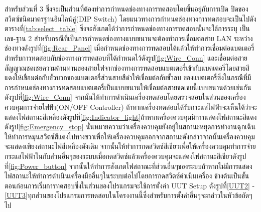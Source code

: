 สำหรับส่วนที่ 3 ซึ่งจะเป็นส่วนที่ต้องทำการกำหนดช่องทางการทดสอบโดยขึ้นอยู่กับการเปิด ปิดของสวิตซ์ชนิดมาตรฐานอินไลน์คู่(DIP Switch)
โดยแนวทางการกำหนดช่องทางการทดสอบจะเป็นไปดังตารางที่\ref{tab:select_table} ซึ่งจะสังเกตได้ว่าการกำหนดช่องทางการทดสอบนั้นจะใช้การระบุ
เป็นเลข-ฐาน 2 สำหรับกรณีที่เป็นการกำหนดช่องทางแบบขนานจะต้องทำการเชื่อมต่อสาย LAN ระหว่างช่องทางดังรูปที่\ref{fig:Rear_Panel} เมื่อกำหนดช่องทางการทดสอบได้แล้วให้ทำการเชื่อมต่อแบตเตอรี่สำหรับการทดสอบกับช่องทางการทดสอบที่ได้กำหนดไว้ดังรูป\ref{fig:Wire_Conn} และเชื่อมต่อสายสัญญาณชดเชยความต้านทานของสายไฟจากช่องทางการทดสอบแบตเตอรี่เข้ากับแบตเตอรี่โดยสายสีแดงให้เชื่อมต่อกับขั้วบวกของแบตเตอรี่ส่วนสายสีดำให้เชื่อมต่อกับขั้วลบ
ของแบตเตอรี่ซึ่งในกรณีที่มีการกำหนดช่องทางการทดสอบแบตเตอรี่เป็นแบบขนานให้เชื่อมต่อสายชดเชยนี้แบบขนานด้วยเช่นกันดังรูปที่\ref{fig:Wire_Conn}
จากนั้นให้ทำการดำเนินเครื่องทดสอบโดยตรวจสอบในส่วนของเครื่องควบคุมการจ่ายไฟฟ้า(ON/OFF Controller)
ถ้าหากเครื่องทดสอบได้รับกระแสไฟฟ้าจะเห็นได้ว่าจะแสดงไฟสถานะสีเหลืองดังรูปที่\ref{fig:Indicator_light}ถ้าหากเครื่องควบคุมมีการแสดงไฟสถานะสีแดงดังรูป\ref{fig:Emergency_stop} นั่นหมายความว่าเครื่องควบคุมยังอยู่ในสถานะหยุดการทำงานฉุกเฉินให้ทำการหมุนสวิตซ์สีแดงไปทางขวาเพื่อให้เครื่องควบคุมออกจากสถานะดังกล่าวจากนั้นเครื่องควบคุมจะแสดงเพียงสถานะไฟสีเหลืองดังเดิม จากนั้นให้ทำการกดสวิตซ์สีเขียวเพื่อให้เครื่องควบคุมทำการจ่ายกระแสไฟฟ้าในกับส่วนอื่นๆของระบบเมื่อกดสวิตซ์แล้วเครื่องควบคุมจะแสดงไฟสถานะสีเขียวดังรูปที่\ref{fig:Power_button}
จากนั้นให้ทำการสังเกตไฟสถาณะที่ส่วนอื่นๆของระบบถ้าหากไม่มีการแสดงไฟสถานะให้ทำการดำเนินเครื่องมืออื่นๆในระบบต่อไปโดยการกดสวิตซ์ดำเนินเครื่อง
\newline 
\hspace*{2cm}
ข้างต้นเป็นขั้นตอนก่อนการเริ่มการทดสอบซึ่งในส่วนของโปรแกรมจะใช้การตั้งค่า UUT Setup 
ดังรูปที่\ref{UUT2} - \ref{UUT3}ทุกส่วนของโปรแกรมการทดสอบในโครงงานนี้ซึ่งสำหรับการตั้งค่าอื่นๆจะกล่าวในหัวข้อถัดๆไป
